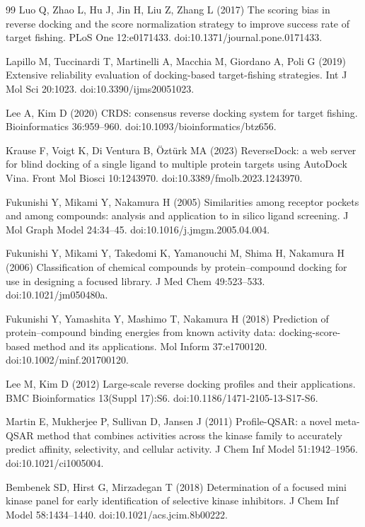 \begin{thebibliography}{99}
 Luo Q, Zhao L, Hu J, Jin H, Liu Z, Zhang L (2017) The scoring
bias in reverse docking and the score normalization strategy to improve success
rate of target fishing. PLoS One 12:e0171433.
doi:10.1371/journal.pone.0171433.

 Lapillo M, Tuccinardi T, Martinelli A, Macchia M,
Giordano A, Poli G (2019) Extensive reliability evaluation of docking-based
target-fishing strategies. Int J Mol Sci 20:1023.
doi:10.3390/ijms20051023.

 Lee A, Kim D (2020) CRDS: consensus reverse docking system
for target fishing. Bioinformatics 36:959--960.
doi:10.1093/bioinformatics/btz656.

 Krause F, Voigt K, Di Ventura B, {\"O}zt{\"u}rk MA (2023)
ReverseDock: a web server for blind docking of a single ligand to multiple
protein targets using AutoDock Vina. Front Mol Biosci 10:1243970.
doi:10.3389/fmolb.2023.1243970.

 Fukunishi Y, Mikami Y, Nakamura H (2005) Similarities
among receptor pockets and among compounds: analysis and application to
in silico ligand screening. J Mol Graph Model 24:34--45.
doi:10.1016/j.jmgm.2005.04.004.

 Fukunishi Y, Mikami Y, Takedomi K, Yamanouchi M,
Shima H, Nakamura H (2006) Classification of chemical compounds by
protein--compound docking for use in designing a focused library. J Med Chem
49:523--533. doi:10.1021/jm050480a.

 Fukunishi Y, Yamashita Y, Mashimo T, Nakamura H (2018)
Prediction of protein--compound binding energies from known activity data:
docking-score-based method and its applications. Mol Inform 37:e1700120.
doi:10.1002/minf.201700120.

 Lee M, Kim D (2012) Large-scale reverse docking
profiles and their applications. BMC Bioinformatics 13(Suppl 17):S6.
doi:10.1186/1471-2105-13-S17-S6.

 Martin E, Mukherjee P, Sullivan D, Jansen J (2011)
Profile-QSAR: a novel meta-QSAR method that combines activities across the
kinase family to accurately predict affinity, selectivity, and cellular
activity. J Chem Inf Model 51:1942--1956. doi:10.1021/ci1005004.

 Bembenek SD, Hirst G, Mirzadegan T (2018)
Determination of a focused mini kinase panel for early identification of
selective kinase inhibitors. J Chem Inf Model 58:1434--1440.
doi:10.1021/acs.jcim.8b00222.


\end{thebibliography}
